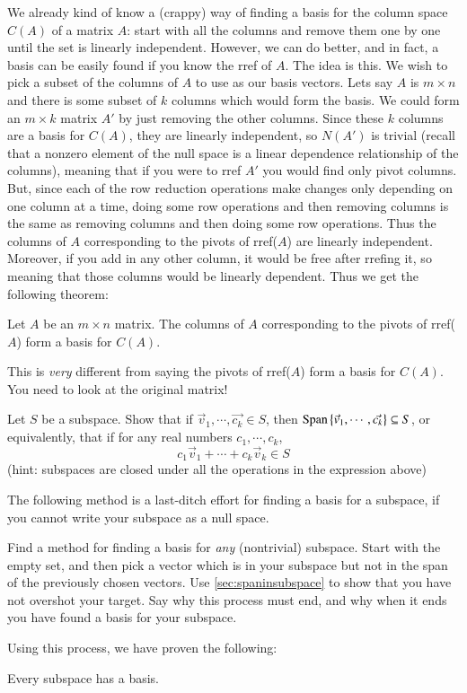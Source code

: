 We already kind of know a (crappy) way of finding a basis for the column space $C(A)$ of a matrix $A$:
start with all the columns and remove them one by one until the set is linearly independent.  
However, we can do better, and in fact, a basis can be easily found if you know the rref of $A$.
The idea is this.
We wish to pick a subset of the columns of $A$ to use as our basis vectors.  
Lets say $A$ is $m\times n$ and there is some subset of $k$ columns which would form the basis.
We could form an $m\times k$ matrix $A'$ by just removing the other columns.
Since these $k$ columns are a basis for $C(A)$, they are linearly independent, so $N(A')$ is trivial (recall that a nonzero element of the null space is a linear dependence relationship of the columns), meaning that if you were to rref $A'$ you would find only pivot columns.
But, since each of the row reduction operations make changes only depending on one column at a time, doing some row operations and then removing columns is the same as removing columns and then doing some row operations.  
Thus the columns of $A$ corresponding to the pivots of rref($A$) are linearly independent.  
Moreover, if you add in any other column, it would be free after rrefing it, so meaning that those columns would be linearly dependent.
Thus we get the following theorem:

\begin{Theorem}
  Let $A$ be an $m\times n$ matrix.  The columns of $A$ corresponding to the pivots of rref($A$) form a basis for $C(A)$.  
\end{Theorem}
\begin{Warning}
  This is \emph{very} different from saying the pivots of rref($A$) form a basis for $C(A)$.  
  You need to look at the original matrix!
\end{Warning}

\begin{Ex}
  \label{sec:spaninsubspace}
  Let $S$ be a subspace.  Show that if $\vec{v}_1,\cdots,\vec{c_k}\in S$, then $\operatorname{Span}\nolimits\left\{\vec{v}_1,\cdots,\vec{c_k}\right\}\subseteq S$, or equivalently, that if for any real numbers $c_1,\cdots,c_k$, 
  \[c_1\vec{v}_1 + \cdots + c_k\vec{v}_k\in S\]
  (hint: subspaces are closed under all the operations in the expression above)
\end{Ex}

The following method is a last-ditch effort for finding a basis for a subspace, if you cannot write your subspace as a null space.  
\begin{TrickyEx}
  Find a method for finding a basis for \emph{any} (nontrivial) subspace.
  Start with the empty set, and then pick a vector which is in your subspace but not in the span of the previously chosen vectors.  
  Use \ref{sec:spaninsubspace} to show that you have not overshot your target.
  Say why this process must end, and why when it ends you have found a basis for your subspace.  
\end{TrickyEx}
Using this process, we have proven the following:
\begin{Theorem}
  \label{sec:allspacesgotbases}
  Every subspace has a basis.
\end{Theorem}

